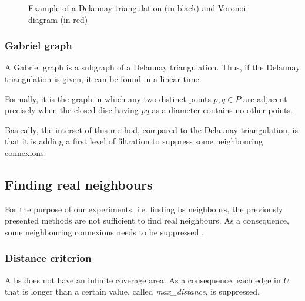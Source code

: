 \documentclass[lettersize,journal,english]{IEEEtran}
\begin{document}
            \begin{figure}
                \centering
                \caption{Example of a Delaunay triangulation (in black) and Voronoi diagram (in red)}
                \label{fig:del_tri}
            \end{figure}

        \subsubsection{Gabriel graph}
            A Gabriel graph \cite{10.2307/2412323} is a subgraph of a Delaunay triangulation. Thus, if the Delaunay triangulation is given, it can be found in a linear time. 

            Formally, it is the graph in which any two distinct points $p, q \in P$ are adjacent precisely when the closed disc having $pq$ as a diameter contains no other points.

            Basically, the interset of this method, compared to the Delaunay triangulation, is that it is adding a first level of filtration to suppress some neighbouring connexions.

    \subsection{Finding real neighbours}
        For the purpose of our experiments, i.e. finding \acrshort{bs} neighbours, the previously presented methods are not sufficient to find real neighbours.
        As a consequence, some neighbouring connexions needs to be suppressed \cite{patent_neighs}.
        \subsubsection{Distance criterion}
            A \acrshort{bs} does not have an infinite coverage area.
            As a consequence, each edge in $U$ that is longer than a certain value, called \emph{max\_distance}, is suppressed.
\end{document}

